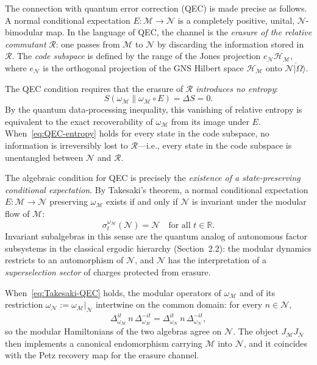 \documentclass[a4paper,11pt]{article}
\theoremstyle{definition}
\begin{document}
The connection with quantum error correction (QEC) is made precise as follows.  A normal
conditional expectation $E:\mathcal{M}\to\mathcal{N}$ is a completely positive, unital,
$\mathcal{N}$-bimodular map.  In the language of QEC, the channel is the \emph{erasure
of the relative commutant} $\mathcal{R}$: one passes from $\mathcal{M}$ to $\mathcal{N}$
by discarding the information stored in $\mathcal{R}$.  The \emph{code subspace} is
defined by the range of the Jones projection $e_\mathcal{N}\mathcal{H}_\mathcal{M}$,
where $e_\mathcal{N}$ is the orthogonal projection of the GNS Hilbert space
$\mathcal{H}_\mathcal{M}$ onto $\overline{\mathcal{N}|\Omega\rangle}$.

The QEC condition requires that the erasure of $\mathcal{R}$ \emph{introduces no entropy}:
\begin{equation}
  S(\omega_\mathcal{M}\|\omega_\mathcal{M}\circ E) = \Delta S = 0.
  \label{eq:QEC-entropy}
\end{equation}
By the quantum data-processing inequality, this vanishing of relative entropy is equivalent
to the exact recoverability of $\omega_\mathcal{M}$ from its image under $E$.  When~\eqref{eq:QEC-entropy}
holds for every state in the code subspace, no information is irreversibly lost to
$\mathcal{R}$---i.e., every state in the code subspace is unentangled between $\mathcal{N}$
and $\mathcal{R}$.

The algebraic condition for QEC is precisely the \emph{existence of a state-preserving
conditional expectation}.  By Takesaki's theorem, a normal conditional expectation
$E:\mathcal{M}\to\mathcal{N}$ preserving $\omega_\mathcal{M}$ exists if and only if
$\mathcal{N}$ is invariant under the modular flow of $\mathcal{M}$:
\begin{equation}
  \sigma_t^{\omega_\mathcal{M}}(\mathcal{N}) = \mathcal{N}
  \quad\text{for all }t\in\mathbb{R}.
  \label{eq:Takesaki-QEC}
\end{equation}
Invariant subalgebras in this sense are the quantum analog of autonomous factor subsystems
in the classical ergodic hierarchy (Section~2.2): the modular dynamics restricts to an
automorphism of $\mathcal{N}$, and $\mathcal{N}$ has the interpretation of a
\emph{superselection sector} of charges protected from erasure.

When~\eqref{eq:Takesaki-QEC} holds, the modular operators of $\omega_\mathcal{M}$ and
of its restriction $\omega_\mathcal{N}:=\omega_\mathcal{M}|_\mathcal{N}$ intertwine on
the common domain: for every $n\in\mathcal{N}$,
\begin{equation}
  \Delta_{\omega_\mathcal{M}}^{it}\, n\, \Delta_{\omega_\mathcal{M}}^{-it}
  = \Delta_{\omega_\mathcal{N}}^{it}\, n\, \Delta_{\omega_\mathcal{N}}^{-it},
  \label{eq:modular-intertwining}
\end{equation}
so the modular Hamiltonians of the two algebras agree on $\mathcal{N}$.  The object
$J_\mathcal{M} J_\mathcal{N}$ then implements a canonical endomorphism carrying
$\mathcal{M}$ into $\mathcal{N}$, and it coincides with the Petz recovery map for
the erasure channel.
\end{document}
